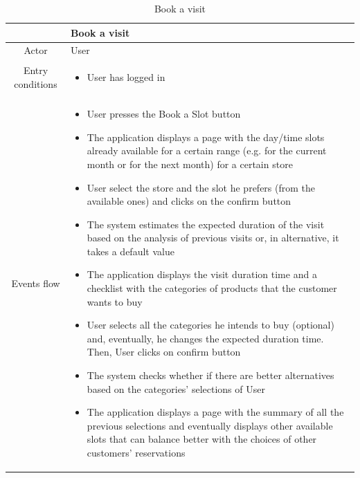 \documentclass[table, 12pt]{article}
\begin{document}
\begin{longtable}{|c| p{10cm}|}
    \caption{Book a visit}                                                                                                                                          \\
    \hline
                     & Book a visit                                                                                                                                 \\
    \hline
    Actor            & User                                                                                                                                         \\
    \hline
    Entry conditions & \begin{itemize}
        \item User has logged in
    \end{itemize}                                                                                                                   \\
    \hline
    Events flow      & \begin{itemize}[nosep,after=\strut]
        \item User presses the Book a Slot button
        \item The application displays a page with the day/time slots already available for a certain range (e.g. for the current month or for the next month) for a certain store
        \item User select the store and the slot he prefers (from the available ones) and clicks on the confirm button
        \item The system estimates the expected duration of the visit based on the analysis of previous visits or, in alternative, it takes a default value
        \item The application displays the visit duration time and a checklist with the categories of products that the customer wants to buy
        \item User selects all the categories he intends to buy (optional) and, eventually, he changes the expected duration time. Then, User clicks on confirm button
        \item The system checks whether if there are better alternatives based on the categories' selections of User
        \item The application displays a page with the summary of all the previous selections and eventually displays other available slots that can balance better with the choices of other customers' reservations

\end{itemize}
\end{longtable}
\end{document}
